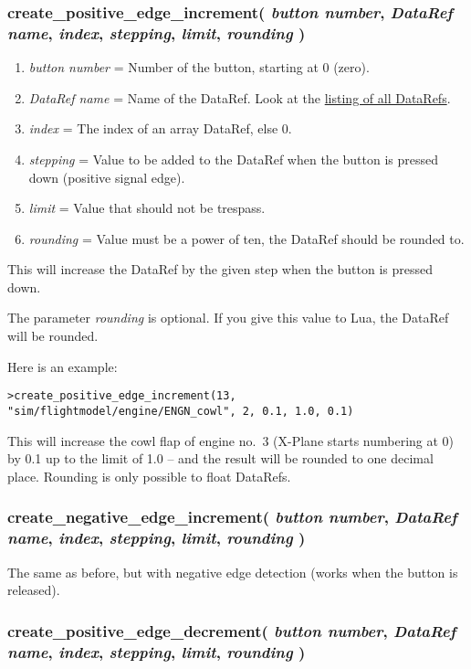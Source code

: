\documentclass[11pt,parskip=half,a4paper]{scrartcl}
\begin{document}
\subsubsection{create\_positive\_edge\_increment( \emph{button number}, \emph{DataRef name}, \emph{index}, \emph{stepping}, \emph{limit}, \emph{rounding} )}

\begin{enumerate}
	\item \emph{button number} = Number of the button, starting at 0 (zero).
	\item \emph{DataRef name} = Name of the DataRef. Look at the \href{http://www.xsquawkbox.net/xpsdk/docs/DataRefs.html}{listing of all DataRefs}.
	\item \emph{index} = The index of an array DataRef, else 0.
	\item \emph{stepping} = Value to be added to the DataRef when the button is pressed down (positive signal edge).
	\item \emph{limit} = Value that should not be trespass.
	\item \emph{rounding} = Value must be a power of ten, the DataRef should be rounded to.
\end{enumerate}

This will increase the DataRef by the given step when the button is pressed down.

The parameter \emph{rounding} is optional. If you give this value to Lua, the DataRef will be rounded.

Here is an example:

\verb|>create_positive_edge_increment(13, "sim/flightmodel/engine/ENGN_cowl", 2, 0.1, 1.0, 0.1)|

This will increase the cowl flap of engine no.~3 (X-Plane starts numbering at 0) by 0.1 up to the limit of 1.0 -- and the result will be rounded to one decimal place. Rounding is only possible to float DataRefs.

\subsubsection{create\_negative\_edge\_increment( \emph{button number}, \emph{DataRef name}, \emph{index}, \emph{stepping}, \emph{limit}, \emph{rounding} )}

The same as before, but with negative edge detection (works when the button is released).

\subsubsection{create\_positive\_edge\_decrement( \emph{button number}, \emph{DataRef name}, \emph{index}, \emph{stepping}, \emph{limit}, \emph{rounding} )}
\end{document}
